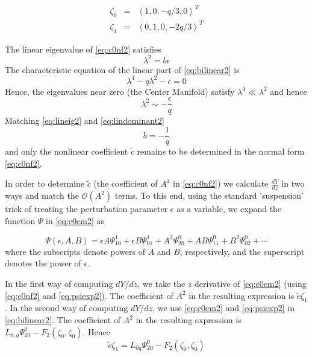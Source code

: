 \begin{subequations}\label{eq:lineareigs2}
\begin{eqnarray}
\zeta_0 &=& \left<1,0,-q/3,0\right>^T\\
\zeta_1 &=& \left<0,1,0,-2 q/3\right>^T 
\end{eqnarray}
\end{subequations}

The linear eigenvalue of \eqref{eq:c0nf2} satisfies 
\begin{equation}\label{eq:lineig2}
\lambda^2 = b \epsilon 
\end{equation}
The characteristic equation of the linear part of 
\eqref{eq:bilinear2} is 
\begin{equation}\label{eq:charlinear2}
\lambda^4 - q \lambda^2 - \epsilon =  0 
\end{equation}
Hence, the eigenvalues near zero (the Center Manifold) satisfy $\lambda^4 \ll \lambda^2$ and hence 
\begin{equation}\label{eq:lindominant2}
\lambda^2 \sim -\frac{\epsilon}{q}
\end{equation}
Matching \eqref{eq:lineig2} and \eqref{eq:lindominant2} 
\begin{equation}
b = - \frac{1}{q}
\end{equation}
and only the nonlinear coefficient $\tilde{c}$ remains to be determined in the normal form \eqref{eq:c0nf2}.

In order to determine $\tilde{c}$ (the coefficient of $A^2$ in \eqref{eq:c0nf2})
we calculate $\frac{dY}{dz}$ in two ways and match the $\mathcal{O}(A^2)$
terms.  To this end, using the standard 'suspension' trick of treating the
perturbation parameter $\epsilon$ as a variable, we expand the function $\Psi$
in \eqref{eq:c0cm2} as 

\begin{equation}\label{eq:psiexp2}
\Psi(\epsilon,A,B) = \epsilon A \Psi_{10}^1 + \epsilon B \Psi_{01}^1 + A^2 \Psi_{20}^0 + A B \Psi_{11}^0 + B^2 \Psi_{02}^0 + \cdots
\end{equation}
where the subscripts denote powers of $A$ and $B$, respectively, and the superscript denotes the power of $\epsilon$. 

In the first way of computing $dY/dz$, we take
the $z$ derivative of \eqref{eq:c0cm2} (using \eqref{eq:c0nf2} and \eqref{eq:psiexp2}). 
The coefficient of $A^2$ in the resulting expression is $\tilde{c} \zeta_1 $. In the second way of computing $dY/dz$, we use \eqref{eq:c0cm2} and \eqref{eq:psiexp2} in \eqref{eq:bilinear2}. The coefficient of $A^2$ in the resulting expression is 
$ L_{0,q} \Psi_{20}^0 - F_2\left(\zeta_0,\zeta_0\right)$.  Hence
\begin{equation}\label{eq:A2coef2}
 \tilde{c} \zeta_1 = L_{0q} \Psi_{20}^0 - F_2(\zeta_0,\zeta_0) \end{equation}

